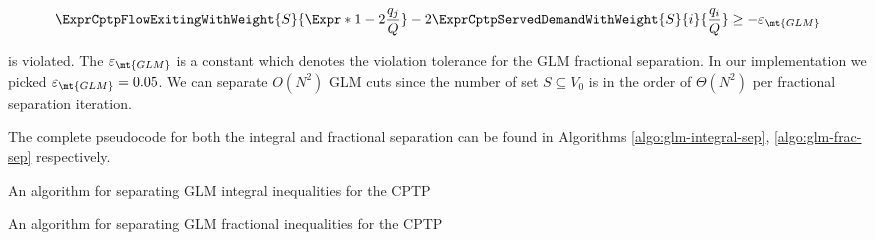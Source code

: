 \begin{equation}
	\begin{split}
		\ExprCptpFlowExitingWithWeight{S}{\Expr*{1 - 2 \frac{q_j}{Q}}} - 2 	\ExprCptpServedDemandWithWeight{S}{i}{\frac{q_i}{Q}} \ge - \varepsilon_{\mt{GLM}}
	\end{split}
\end{equation}

is violated.
The $\varepsilon_{\mt{GLM}}$ is a constant which denotes the violation tolerance for the GLM fractional separation.
In our implementation we picked $\varepsilon_{\mt{GLM}} = 0.05$.
We can separate $O(N^2)$ GLM cuts since the number of set $S \subseteq V_0$ is in the order of $\Theta(N^2)$ per fractional separation iteration.

The complete pseudocode for both the integral and fractional separation can be found in Algorithms \ref{algo:glm-integral-sep}, \ref{algo:glm-frac-sep} respectively.

\begin{algorithm}
	\caption{An algorithm for separating GLM integral inequalities for the CPTP}
	\label{algo:glm-integral-sep}
	
\end{algorithm}

\begin{algorithm}
	\caption{An algorithm for separating GLM fractional inequalities for the CPTP}
	\label{algo:glm-frac-sep}
	
\end{algorithm}
